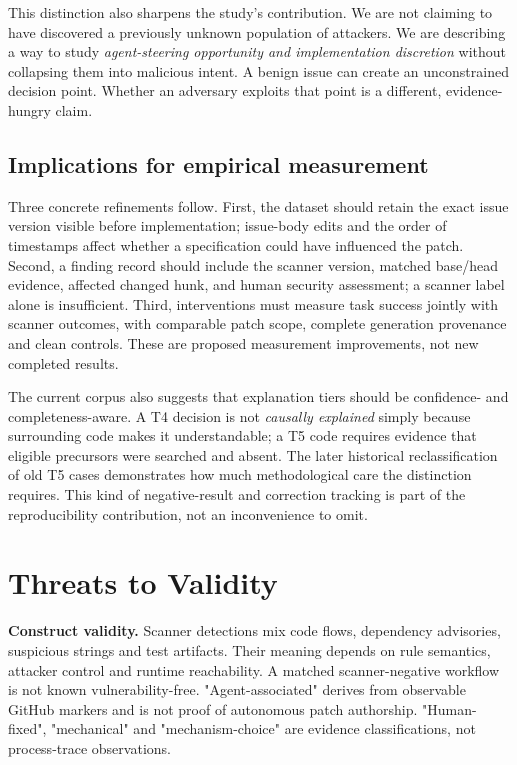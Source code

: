 \documentclass[journal,10pt,twoside]{IEEEtran}
\begin{document}
This distinction also sharpens the study's contribution. We are not claiming to have discovered a previously unknown population of attackers. We are describing a way to study \emph{agent-steering opportunity and implementation discretion} without collapsing them into malicious intent. A benign issue can create an unconstrained decision point. Whether an adversary exploits that point is a different, evidence-hungry claim.

\subsection{Implications for empirical measurement}
Three concrete refinements follow. First, the dataset should retain the exact issue version visible before implementation; issue-body edits and the order of timestamps affect whether a specification could have influenced the patch. Second, a finding record should include the scanner version, matched base/head evidence, affected changed hunk, and human security assessment; a scanner label alone is insufficient. Third, interventions must measure task success jointly with scanner outcomes, with comparable patch scope, complete generation provenance and clean controls. These are proposed measurement improvements, not new completed results.

The current corpus also suggests that explanation tiers should be confidence- and completeness-aware. A T4 decision is not \emph{causally explained} simply because surrounding code makes it understandable; a T5 code requires evidence that eligible precursors were searched and absent. The later historical reclassification of old T5 cases demonstrates how much methodological care the distinction requires. This kind of negative-result and correction tracking is part of the reproducibility contribution, not an inconvenience to omit.

\section{Threats to Validity}
\textbf{Construct validity.} Scanner detections mix code flows, dependency advisories, suspicious strings and test artifacts. Their meaning depends on rule semantics, attacker control and runtime reachability. A matched scanner-negative workflow is not known vulnerability-free. "Agent-associated" derives from observable GitHub markers and is not proof of autonomous patch authorship. "Human-fixed", "mechanical" and "mechanism-choice" are evidence classifications, not process-trace observations.
\end{document}
